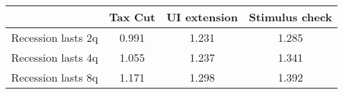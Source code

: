 \begin{tabular}{@{}lccc@{}} 
\toprule 
& Tax Cut    & UI extension    & Stimulus check    \\  \midrule 
Recession lasts 2q &0.991  & 1.231  & 1.285     \\ 
Recession lasts 4q &1.055  & 1.237  & 1.341     \\ 
Recession lasts 8q &1.171  & 1.298  & 1.392     \\ 
\end{tabular}  
